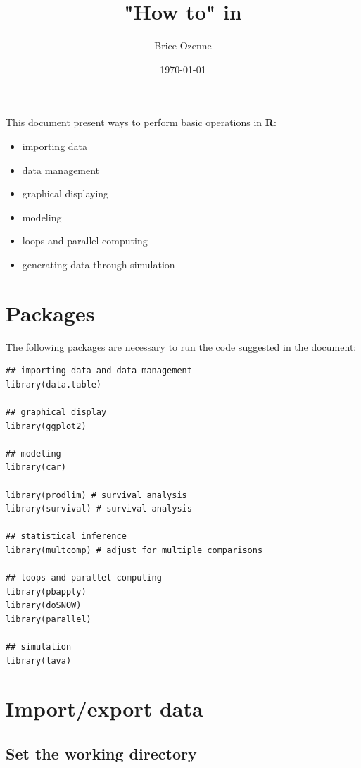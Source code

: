 \documentclass{article}
\author{Brice Ozenne}
\date{\today}
\title{"How to" in \Rlogo}
\newcommand\Rlogo{\textbf{\textsf{R}}\xspace}
\begin{document}
\maketitle
This document present ways to perform basic operations in \Rlogo:
\begin{itemize}
\item importing data
\item data management
\item graphical displaying
\item modeling
\item loops and parallel computing
\item generating data through simulation
\end{itemize}

\clearpage

\tableofcontents

\clearpage

\section{Packages}
\label{sec:org039faae}
The following packages are necessary to run the code suggested in the document:
\lstset{language=r,label= ,caption= ,captionpos=b,numbers=none}
\begin{lstlisting}
## importing data and data management
library(data.table)

## graphical display
library(ggplot2)

## modeling
library(car)

library(prodlim) # survival analysis
library(survival) # survival analysis

## statistical inference
library(multcomp) # adjust for multiple comparisons

## loops and parallel computing
library(pbapply)
library(doSNOW)
library(parallel)

## simulation
library(lava)
\end{lstlisting}

\clearpage

\section{Import/export data}
\label{sec:org1b5448a}
\subsection{Set the working directory}
\label{sec:org2ab2af5}
\end{document}
